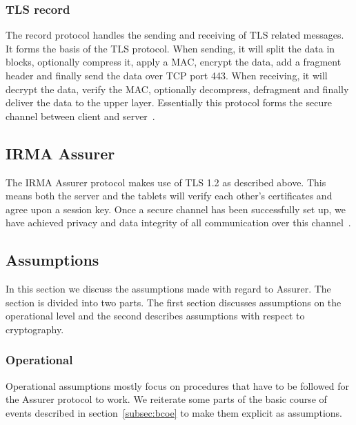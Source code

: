 \subsubsection{TLS record}
The record protocol handles the sending and receiving of TLS related messages. It forms the basis of the TLS protocol. When sending, it will split the data in blocks, optionally compress it, apply a MAC, encrypt the data, add a fragment header and finally send the data over TCP port 443. When receiving, it will decrypt the data, verify the MAC, optionally decompress, defragment and finally deliver the data to the upper layer. Essentially this protocol forms the secure channel between client and server~\cite{tls1.2}.

\subsection{IRMA Assurer}
The IRMA Assurer protocol makes use of TLS 1.2 as described above. This means both the server and the tablets will verify each other's certificates and agree upon a session key. Once a secure channel has been successfully set up, we have achieved privacy and data integrity of all communication over this channel~\cite{tls1.2}.

\subsection{Assumptions}
\label{sec:assumptions}
In this section we discuss the assumptions made with regard to Assurer. The section is divided into two parts. The first section discusses assumptions on the operational level and the second describes assumptions with respect to cryptography.

\subsubsection{Operational}
Operational assumptions mostly focus on procedures that have to be followed for the Assurer protocol to work. We reiterate some parts of the basic course of events described in section~\ref{subsec:bcoe} to make them explicit as assumptions. 

